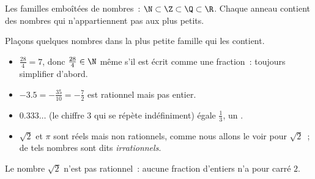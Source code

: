 \begin{omfigure}

{\small Les familles emboîtées de nombres~: $\N \subset \Z \subset \Q
\subset \R$. Chaque anneau contient des nombres qui n'appartiennent
pas aux plus petits.}
\end{omfigure}

\begin{example}\label{ex:g10:numbers:classify}
Plaçons quelques nombres dans la plus petite famille qui les contient.
\begin{itemize}
  \item $\frac{28}{4} = 7$, donc $\frac{28}{4} \in \N$ même s'il est
        écrit comme une fraction~: toujours simplifier d'abord.
  \item $-3.5 = -\frac{35}{10} = -\frac72$ est rationnel mais pas
        entier.
  \item $0.333\dots$ (le chiffre $3$ qui se répète indéfiniment)
        égale $\frac13$, un .
  \item $\sqrt 2$ et $\pi$ sont réels mais non rationnels, comme nous
        allons le voir pour $\sqrt 2$~; de tels nombres sont dits
        \emph{irrationnels}.
\end{itemize}
\end{example}

\begin{theorem}\label{thm:g10:numbers:sqrt2}
Le nombre $\sqrt 2$ n'est pas rationnel~: aucune fraction d'entiers
n'a pour carré $2$.
\end{theorem}

